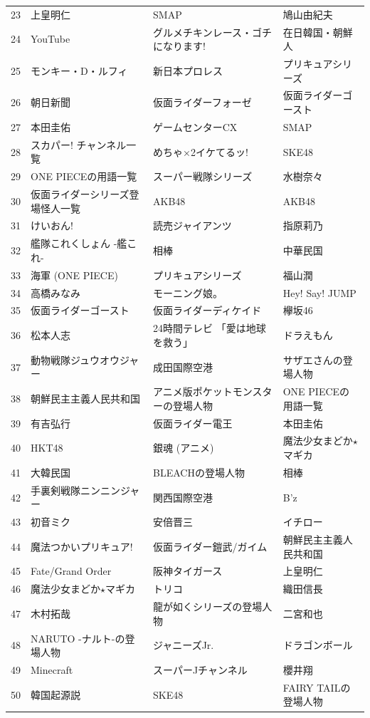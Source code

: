 \documentclass[10pt,british,A4paper,oneside]{memoir}
\begin{document}
\begin{table}
{\begin{tabular}{@{}p{0.1cm}lll@{}}
23&上皇明仁&SMAP&鳩山由紀夫\\
24&YouTube&グルメチキンレース・ゴチになります!&在日韓国・朝鮮人\\
25&モンキー・D・ルフィ&新日本プロレス&プリキュアシリーズ\\
26&朝日新聞&仮面ライダーフォーゼ&仮面ライダーゴースト\\
27&本田圭佑&ゲームセンターCX&SMAP\\
28&スカパー! チャンネル一覧&めちゃ×2イケてるッ!&SKE48\\
29&ONE PIECEの用語一覧&スーパー戦隊シリーズ&水樹奈々\\
30&仮面ライダーシリーズ登場怪人一覧&AKB48&AKB48\\
31&けいおん!&読売ジャイアンツ&指原莉乃\\
32&艦隊これくしょん -艦これ-&相棒&中華民国\\
33&海軍 (ONE PIECE)&プリキュアシリーズ&福山潤\\
34&高橋みなみ&モーニング娘。&Hey! Say! JUMP\\
35&仮面ライダーゴースト&仮面ライダーディケイド&欅坂46\\
36&松本人志&24時間テレビ 「愛は地球を救う」&ドラえもん\\
37&動物戦隊ジュウオウジャー&成田国際空港&サザエさんの登場人物\\
38&朝鮮民主主義人民共和国&アニメ版ポケットモンスターの登場人物&ONE PIECEの用語一覧\\
39&有吉弘行&仮面ライダー電王&本田圭佑\\
40&HKT48&銀魂 (アニメ)&魔法少女まどか$\star$マギカ\\
41&大韓民国&BLEACHの登場人物&相棒\\
42&手裏剣戦隊ニンニンジャー&関西国際空港&B'z\\
43&初音ミク&安倍晋三&イチロー\\
44&魔法つかいプリキュア!&仮面ライダー鎧武/ガイム&朝鮮民主主義人民共和国\\
45&Fate/Grand Order&阪神タイガース&上皇明仁\\
46&魔法少女まどか$\star$マギカ&トリコ&織田信長\\
47&木村拓哉&龍が如くシリーズの登場人物&二宮和也\\
48&NARUTO -ナルト-の登場人物&ジャニーズJr.&ドラゴンボール\\
49&Minecraft&スーパーJチャンネル&櫻井翔\\
50&韓国起源説&SKE48&FAIRY TAILの登場人物\\
\bottomrule
\end{tabular}
}
\end{table}
\end{document}
